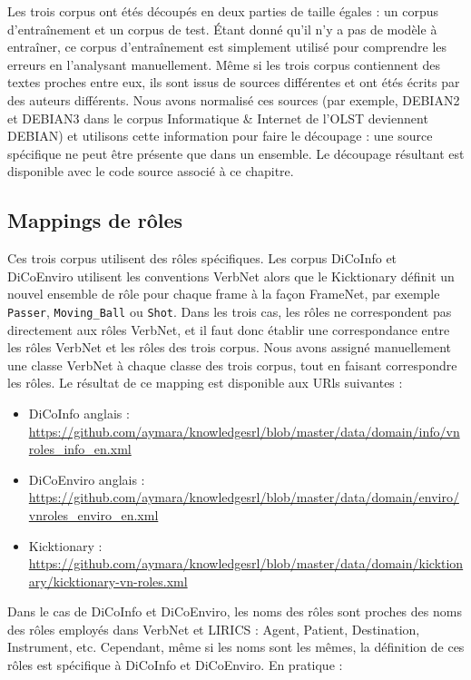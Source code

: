 Les trois corpus ont étés découpés en deux parties de taille égales : un corpus
d'entraînement et un corpus de test. Étant donné qu'il n'y a pas de modèle à
entraîner, ce corpus d'entraînement est simplement utilisé pour comprendre les
erreurs en l'analysant manuellement. Même si les trois corpus contiennent des
textes proches entre eux, ils sont issus de sources différentes et ont étés
écrits par des auteurs différents. Nous avons normalisé ces sources (par
exemple, DEBIAN2 et DEBIAN3 dans le corpus Informatique \& Internet de l'OLST
deviennent DEBIAN) et utilisons cette information pour faire le découpage : une
source spécifique ne peut être présente que dans un ensemble. Le découpage
résultant est disponible avec le code source associé à ce chapitre.

\subsection{Mappings de rôles}

Ces trois corpus utilisent des rôles spécifiques. Les corpus DiCoInfo et
DiCoEnviro utilisent les conventions VerbNet alors que le Kicktionary  définit
un nouvel ensemble de rôle pour chaque frame à la façon FrameNet, par exemple
\texttt{Passer}, \texttt{Moving\_Ball} ou \texttt{Shot}. Dans les trois cas,
les rôles ne correspondent pas directement aux rôles VerbNet, et il faut donc
établir une correspondance entre les rôles VerbNet et les rôles des trois
corpus.  Nous avons assigné manuellement une classe VerbNet à chaque classe des
trois corpus, tout en faisant correspondre les rôles. Le résultat de ce mapping
est disponible aux URls suivantes :

\begin{itemize}
    \item DiCoInfo anglais : \url{https://github.com/aymara/knowledgesrl/blob/master/data/domain/info/vnroles_info_en.xml}
    \item DiCoEnviro anglais : \url{https://github.com/aymara/knowledgesrl/blob/master/data/domain/enviro/vnroles_enviro_en.xml}
    \item Kicktionary : \url{https://github.com/aymara/knowledgesrl/blob/master/data/domain/kicktionary/kicktionary-vn-roles.xml}
\end{itemize}

Dans le cas de DiCoInfo et DiCoEnviro, les noms des rôles sont proches des noms
des rôles employés dans VerbNet et LIRICS \citep{bonial2011hierarchical} :
Agent, Patient, Destination, Instrument, etc. Cependant, même si les noms sont
les mêmes, la définition de ces rôles est spécifique à DiCoInfo et DiCoEnviro.
En pratique :

